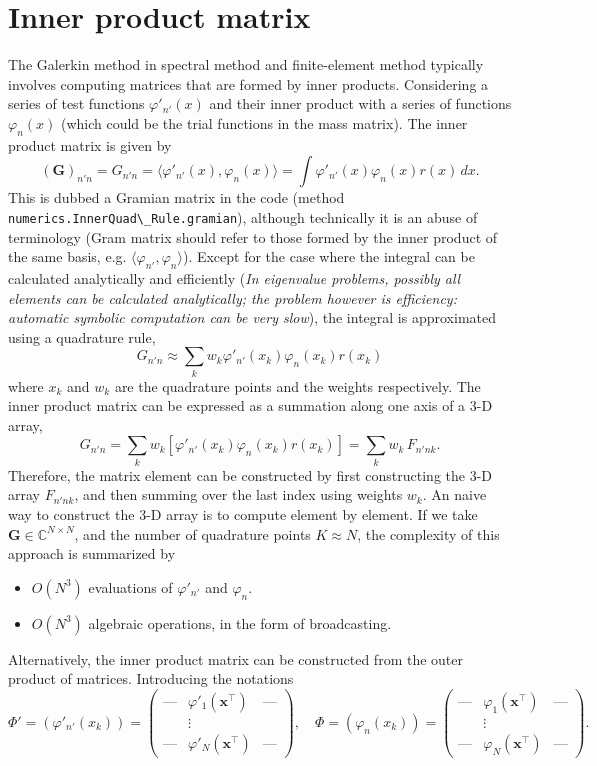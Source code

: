 \section{Inner product matrix}

The Galerkin method in spectral method and finite-element method typically involves computing matrices that are formed by inner products. Considering a series of test functions $\varphi'_{n'}(x)$ and their inner product with a series of functions $\varphi_n(x)$ (which could be the trial functions in the mass matrix). The inner product matrix is given by
\[
(\mathbf{G})_{n'n} = G_{n'n} = \langle \varphi'_{n'}(x), \varphi_n(x)\rangle = \int \varphi'_{n'}(x) \varphi_n(x) r(x)\,dx.
\]
This is dubbed a Gramian matrix in the code (method \colorbox{backcolour}{\lstinline|numerics.InnerQuad\_Rule.gramian|}), although technically it is an abuse of terminology (Gram matrix should refer to those formed by the inner product of the same basis, e.g. $\langle \varphi_{n'}, \varphi_n\rangle$).
Except for the case where the integral can be calculated analytically and efficiently (\textit{In eigenvalue problems, possibly all elements can be calculated analytically; the problem however is efficiency: automatic symbolic computation can be very slow}), the integral is approximated using a quadrature rule,
\[
    G_{n'n} \approx \sum_{k} w_k \varphi'_{n'}(x_k) \varphi_n (x_k) r(x_k)
\]
where $x_k$ and $w_k$ are the quadrature points and the weights respectively.
The inner product matrix can be expressed as a summation along one axis of a 3-D array,
\[
G_{n'n} = \sum_k w_k [\varphi'_{n'}(x_k) \varphi_n (x_k) r(x_k)] = \sum_k w_k \, F_{n'nk}.
\]
Therefore, the matrix element can be constructed by first constructing the 3-D array $F_{n'nk}$, and then summing over the last index using weights $w_k$.
An naive way to construct the 3-D array is to compute element by element.
If we take $\mathbf{G} \in \mathbb{C}^{N\times N}$, and the number of quadrature points $K\approx N$, the complexity of this approach is summarized by
\begin{itemize}
    \item $O(N^3)$ evaluations of $\varphi'_{n'}$ and $\varphi_n$.
    \item $O(N^3)$ algebraic operations, in the form of broadcasting.
\end{itemize}
Alternatively, the inner product matrix can be constructed from the outer product of matrices. Introducing the notations
\[
    \Phi' = (\varphi'_{n'}(x_k)) = \begin{pmatrix}
        \text{---} & \varphi'_1(\mathbf{x}^\intercal) & \text{---} \\
         & \vdots & \\ 
        \text{---} & \varphi'_N(\mathbf{x}^\intercal) & \text{---}
    \end{pmatrix}, \quad 
    \Phi = (\varphi_{n}(x_k)) =  \begin{pmatrix}
        \text{---} & \varphi_1(\mathbf{x}^\intercal) & \text{---} \\
         & \vdots & \\ 
        \text{---} & \varphi_N(\mathbf{x}^\intercal) & \text{---}
    \end{pmatrix}.
\]
